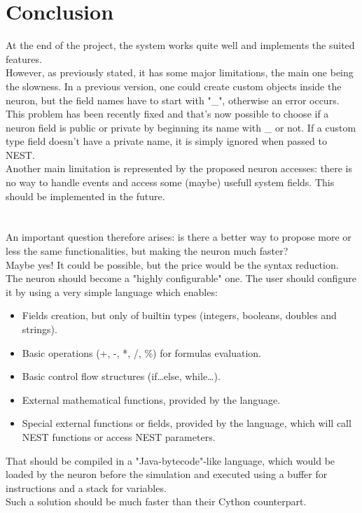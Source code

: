 \documentclass{article}
\begin{document}
\section{Conclusion}
At the end of the project, the system works quite well and implements the suited features.\\
However, as previously stated, it has some major limitations, the main one being the slowness. In a previous version, one could create custom objects inside the neuron, but the field names have to start with "\_", otherwise an error occurs. This problem has been recently fixed and that's now possible to choose if a neuron field is public or private by beginning its name with \_ or not. If a custom type field doesn't have a private name, it is simply ignored when passed to NEST.\\
Another main limitation is represented by the proposed neuron accesses: there is no way to handle events and access some (maybe) usefull system fields. This should be implemented in the future. \\ \\ \\
An important question therefore arises: is there a better way to propose more or less the same 
functionalities, but making the neuron much faster?\\
Maybe yes! It could be possible, but the price would be the syntax reduction. The neuron should become a "highly configurable" one. The user should configure it by using a very simple language which enables:
\begin{itemize}
\item Fields creation, but only of builtin types (integers, booleans, doubles and strings).
\item Basic operations (+, -, *, /, \%) for formulas evaluation.
\item Basic control flow structures (if\ldots else, while\ldots).
\item External mathematical functions, provided by the language.
\item Special external functions or fields, provided by the language, which will call NEST functions or access NEST parameters.
\end{itemize}
That should be compiled in a "Java-bytecode"-like language, which would be loaded by the neuron before the simulation and executed using a buffer for instructions and a stack for variables.\\
Such a solution should be much faster than their Cython counterpart.
\end{document}
